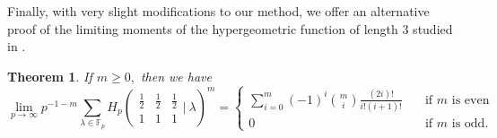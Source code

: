 \documentclass[12pt]{amsart}
\newtheorem{theorem}{Theorem}[section]
\theoremstyle{definition}
\theoremstyle{remark}
\numberwithin{equation}{section}
\def\F{{\mathbb F}}
\def\F{\mathbb{F}}
\begin{document}
Finally, with very slight modifications to our method, we offer an alternative proof of the limiting moments of the hypergeometric function of length $3$ studied in \cite{HGFDistributionOnoSaikia, 3F2Explicit}.

\begin{theorem}\label{theorem4}
    If $m\geq 0,$ then we have
    $$
    \lim\limits_{p\to\infty}p^{-1-m}\sum\limits_{\lambda\in\F_p}H_p\left(\begin{array}{ccc}
    \frac{1}{2} & \frac{1}{2} & \frac{1}{2} \\
     1 & 1 & 1
\end{array}\bigg|\ \lambda\right)^m= \begin{cases}
    \sum\limits_{i=0}^m(-1)^i\binom{m}{i}\frac{(2i)!}{i!(i+1)!} &\ \ \ \text{ if }m\text{ is even} \\
    0 &\ \ \ \text{ if }m\text{ is odd.}
\end{cases}
    $$
\end{theorem}
\end{document}
